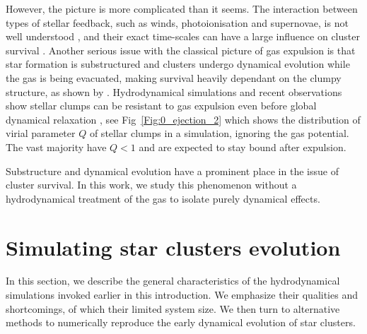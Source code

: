 
However, the picture is more complicated than it seems. The interaction between types of stellar feedback, such as winds, photoionisation and supernovae, is not well understood \citep{Dale2011,Dale2013}, and their exact time-scales can have a large influence on cluster survival \citep{Pelupessy2012}. Another serious issue with the classical picture of gas expulsion is that star formation is substructured and clusters undergo dynamical evolution while the gas is being evacuated, making survival heavily dependant on the clumpy structure, as shown by \cite{Farias2015}. Hydrodynamical simulations and recent observations show stellar clumps can be resistant to gas expulsion even before global dynamical relaxation \citep{Kruijssen2012,Kuhn2015b}, see Fig~\ref{Fig:0_ejection_2} which shows the distribution of virial parameter $Q$ of stellar clumps in a simulation, ignoring the gas potential. The vast majority have $Q<1$ and are expected to stay bound after expulsion.


Substructure and dynamical evolution have a prominent place in the issue of cluster survival. In this work, we study this phenomenon without a hydrodynamical treatment of the gas to isolate purely dynamical effects.



\section{Simulating star clusters evolution}

In this section, we describe the general characteristics of the hydrodynamical simulations invoked
earlier in this introduction. We emphasize their qualities and shortcomings, of which their limited system size. We then turn to alternative methods to numerically reproduce the early dynamical evolution of star clusters.

